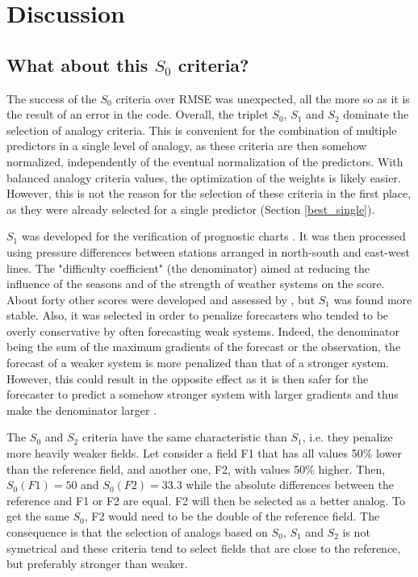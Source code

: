\documentclass[draft]{agujournal2019}
\begin{document}



\section{Discussion}
\label{discussion}

\subsection{What about this $S_{0}$ criteria?}
\label{discussion_S0}

The success of the $S_{0}$ criteria over RMSE was unexpected, all the more so as it is the result of an error in the code. Overall, the triplet $S_{0}$, $S_{1}$ and $S_{2}$ dominate the selection of analogy criteria. This is convenient for the combination of multiple predictors in a single level of analogy, as these criteria are then somehow normalized, independently of the eventual normalization of the predictors. With balanced analogy criteria values, the optimization of the weights is likely easier. However, this is not the reason for the selection of these criteria in the first place, as they were already selected for a single predictor (Section \ref{best_single}).

$S_{1}$ was developed for the verification of prognostic charts \cite{Teweles1954}. It was then processed using pressure differences between stations arranged in north-south and east-west lines. The "difficulty coefficient" (the denominator) aimed at reducing the influence of the seasons and of the strength of weather systems on the score. About forty other scores were developed and assessed by , but $S_{1}$ was found more stable. Also, it was selected in order to penalize forecasters who tended to be overly conservative by often forecasting weak systems. Indeed, the denominator being the sum of the maximum gradients of the forecast or the observation, the forecast of a weaker system is more penalized than that of a stronger system. However, this could result in the opposite effect as it is then safer for the forecaster to predict a somehow stronger system with larger gradients and thus make the denominator larger \cite{Thompson1972}.

The $S_{0}$ and $S_{2}$ criteria have the same characteristic than $S_{1}$, i.e. they penalize more heavily weaker fields. Let consider a field F1 that has all values 50\% lower than the reference field, and another one, F2, with values 50\% higher. Then, $S_{0}(F1) = 50$ and $S_{0}(F2) = 33.3$ while the absolute differences between the reference and F1 or F2 are equal. F2 will then be selected as a better analog. To get the same $S_{0}$, F2 would need to be the double of the reference field. The consequence is that the selection of analogs based on $S_{0}$, $S_{1}$ and $S_{2}$ is not symetrical and these criteria tend to select fields that are close to the reference, but preferably stronger than weaker. 
\end{document}
